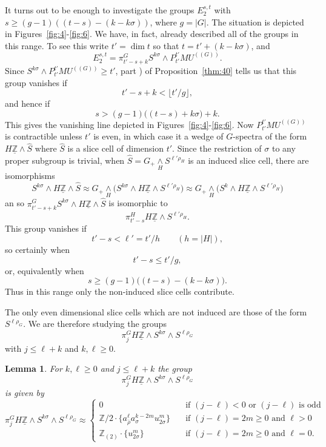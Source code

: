 \documentclass{amsart}
\newtheorem{lem}[equation]{Lemma}
\theoremstyle{definition}
\theoremstyle{remark}
\newcommand{\Z}{{\mathbb Z}}
\newcommand{\thmListItem}[1]{\rm \romannumeral#1)}
\newcommand{\mutn}[1]{MU^{(\!(#1)\!)}}
\newcommand{\slc}[2]{P_{#1}^{#1}#2}
\newcommand{\Zm}{\underline{\Z}}
\newcommand{\zlt}{\Z_{(2)}}
\newcommand{\slicecell}{\widehat{S}}
\begin{document}
It turns out to be enough to investigate the groups $E_{2}^{s,t}$ with
$s\ge (g-1)((t-s)-(k-k\sigma))$, where $g=|G|$.  The situation is
depicted in Figures~\ref{fig:4}-\ref{fig:6}.  We have, in fact,
already described all of the groups in this range.  To see this write
$t'=\dim t$ so that $t=t'+ (k-k\sigma)$, and
\[
E_{2}^{s,t} = \pi^{G}_{t'-s+k}S^{k\sigma}\wedge \slc{t'}{\mutn{G}}.
\]
Since $S^{k\sigma}\wedge \slc{t'}{\mutn{G}}\ge t'$, part \thmListItem{3} of
Proposition~\ref{thm:40} tells us that this group vanishes if 
\[
t'-s+k < \lfloor t'/g \rfloor, 
\]
and hence if
\[
s > (g-1)\big((t-s)+k\sigma ) + k.
\]
This gives the vanishing line depicted in
Figures~\ref{fig:4}-\ref{fig:6}.  Now $\slc{t'}{\mutn{G}}$ is
contractible unless $t'$ is even, in which case it a wedge of
$G$-spectra of the form $H\Zm\wedge \slicecell$ where $\slicecell$ is
a slice cell of dimension $t'$.  Since the restriction of $\sigma$ to
any proper subgroup is trivial, when
$\slicecell=G_{+}\underset{H}{\wedge}S^{\ell'\rho_{H}}$ is an induced
slice cell, there are isomorphisms
\[
S^{k\sigma}\wedge H\Zm\wedge\slicecell \approx
G_{+}\underset{H}{\wedge}\big( S^{k\sigma}\wedge
H\Zm\wedge S^{\ell'\rho_{H}}\big) \approx
G_{+}\underset{H}{\wedge} \big( S^{k}\wedge
H\Zm\wedge S^{\ell'\rho_{H}}\big)
\]
an so $\pi^{G}_{t'-s+k}S^{k\sigma}\wedge H\Zm\wedge \slicecell$ is
isomorphic to 
\[
\pi^{H}_{t'-s} H\Zm\wedge S^{\ell'\rho_{H}}.
\]
This group vanishes if 
\[
t'-s  < \ell' =  t'/h  \qquad (h=|H|),
\]
so certainly when 
\[
t'-s \le t'/g,
\]
or, equivalently when
\[
s\ge  (g-1)\big((t-s) - (k - k\sigma)\big).
\]
Thus in this range only the non-induced slice cells
contribute.     

The only even dimensional slice cells which are not induced are those
of the form $S^{\ell\rho_{G}}$.   We are therefore studying the groups 
\[
\pi^{G}_{j} H\Zm\wedge S^{k\sigma}\wedge S^{\ell\rho_{G}}
\]
with $j \le \ell+k$ and $k,\ell\ge 0$.  

\begin{lem}
\label{thm:84} 
For $k,\ell\ge 0$ and $j\le \ell+k$ the group
\[
\pi^{G}_{j} H\Zm\wedge S^{k\sigma}\wedge S^{\ell\rho_{G}} 
\]
is given by
\[
\pi^{G}_{j} H\Zm\wedge S^{k\sigma}\wedge S^{\ell\rho_{G}}  \approx
\begin{cases}
0 &\quad \text{if }(j-\ell)<0\text{ or }(j-\ell)\text{ is odd}    \\
\Z/2\cdot \{a_{\bar{\rho}}^{\ell}a_{\sigma}^{k-2m}u_{2\sigma}^{m}\} & \quad \text{if }(j-\ell) = 2m
\ge 0 \text{ and }\ell >0  \\
\zlt\cdot\{u_{2\sigma}^{m}\} &\quad \text{if }(j-\ell) = 2m
\ge 0 \text{ and }\ell  = 0.
\end{cases}
\]
\end{lem}
\end{document}
